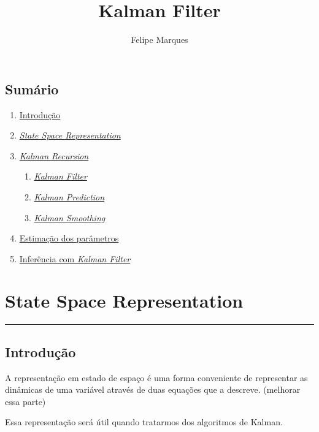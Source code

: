 \documentclass[
  letterpaper,
  DIV=11,
  numbers=noendperiod]{scrartcl}
\title{Kalman Filter}
\author{Felipe Marques}
\date{}
\providecommand{\tightlist}{%
  \setlength{\itemsep}{0pt}\setlength{\parskip}{0pt}}\usepackage{longtable,booktabs,array}
\begin{document}
\maketitle

\subsection{Sumário}\label{sumuxe1rio}

\begin{enumerate}
\def\labelenumi{\arabic{enumi}.}
\tightlist
\item
  \hyperref[sec-introducao]{Introdução}
\item
  \hyperref[sec-state-space]{\emph{State Space Representation}}
\item
  \hyperref[sec-kalman-recursion]{\emph{Kalman Recursion}}

  \begin{enumerate}
  \def\labelenumii{\arabic{enumii}.}
  \tightlist
  \item
    \hyperref[sec-kalman-filter]{\emph{Kalman Filter}}
  \item
    \hyperref[sec-kalman-prediction]{\emph{Kalman Prediction}}
  \item
    \hyperref[sec-kalman-smoothing]{\emph{Kalman Smoothing}}
  \end{enumerate}
\item
  \hyperref[sec-estimacao]{Estimação dos parâmetros}
\item
  \hyperref[sec-inferencia]{Inferência com \emph{Kalman Filter}}
\end{enumerate}

\section{State Space Representation}\label{state-space-representation}

\begin{center}\rule{0.5\linewidth}{0.5pt}\end{center}

\subsection{Introdução}\label{sec-introducao}

A representação em estado de espaço é uma forma conveniente de
representar as dinâmicas de uma variável através de duas equações que a
descreve. (melhorar essa parte)

Essa representação será útil quando tratarmos dos algoritmos de Kalman.
\end{document}
